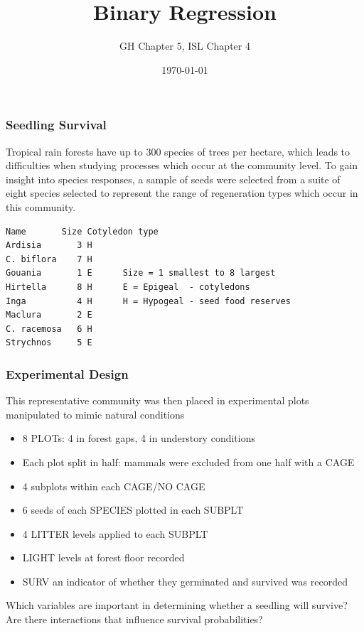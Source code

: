 \documentclass[handout]{beamer}\usepackage[]{graphicx}\usepackage[]{color}
\title{Binary Regression}
\author{GH Chapter 5, ISL Chapter 4 }
\date{\today}
\begin{document}
\maketitle



\begin{frame}[fragile]\frametitle{Seedling Survival}

  Tropical rain forests have up to 300 species of trees per hectare,
  which leads to difficulties when studying processes which occur at
  the community level. To gain insight into species responses, a
  sample of seeds were selected from a suite of eight species selected
  to represent the range of regeneration types which occur in this
  community.
\begin{verbatim}
Name       Size Cotyledon type
Ardisia       3 H
C. biflora    7 H
Gouania       1 E      Size = 1 smallest to 8 largest
Hirtella      8 H      E = Epigeal  - cotyledons
Inga          4 H      H = Hypogeal - seed food reserves
Maclura       2 E
C. racemosa   6 H
Strychnos     5 E
\end{verbatim}
\end{frame}

\begin{frame}\frametitle{Experimental Design}
 This representative community was then placed in
  experimental plots manipulated to mimic natural conditions \pause
  \begin{itemize}
  \item 8 PLOTs: 4 in forest gaps, 4 in understory conditions \pause
  \item Each plot split in half:  mammals were excluded from
  one half with a CAGE \pause
  \item 4 subplots within each CAGE/NO CAGE \pause
  \item 6 seeds of each SPECIES plotted in each SUBPLT \pause
  \item 4 LITTER levels applied to each SUBPLT \pause
  \item LIGHT levels at forest floor recorded \pause
  \item  SURV  an indicator of whether they germinated and survived was
  recorded \pause
  \end{itemize}
  Which variables are important in determining whether a
  seedling will survive? Are there interactions that influence
  survival probabilities?
\end{frame}
\end{document}
